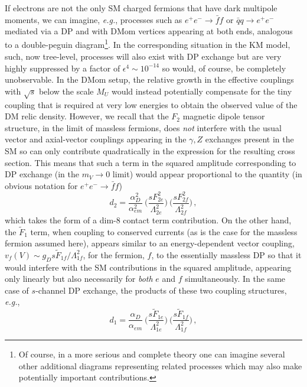 \documentclass[14pt]{article}
\def\eg{{\it e.g.}}
\def\to{\rightarrow}
\begin{document}
{If electrons are not the only SM charged fermions that have dark multipole moments, we can imagine, \eg, processes such as $e^+e^-\to \bar ff$ or $\bar qq\to e^+e^-$ mediated via a DP and with 
DMom vertices appearing at both ends, analogous to a double-peguin diagram{\footnote {Of course, in a more serious and complete theory one can imagine several other additional diagrams 
representing related processes which may also make potentially important 
contributions.}}. In the corresponding situation in the KM model, such, now tree-level, processes will also exist with DP exchange but are very highly suppressed by a factor of $\epsilon^4\sim 10^{-14}$ 
so would, of course, be completely unobservable. In the DMom setup, the relative growth in the effective couplings with $\sqrt s$ below the scale $M_U$ would instead potentially compensate for the 
tiny coupling that is required at very low energies to obtain the observed value of the DM relic density. 
However, we recall that the $F_2$ magnetic dipole tensor structure, in the limit of massless fermions, does {\it not} interfere with the usual vector and axial-vector couplings appearing in  the 
$\gamma,Z$ exchanges present in the 
SM so can only contribute quadratically in the expression for the resulting cross section. This means that such a term in the squared amplitude corresponding to DP exchange (in the $m_V\to 0$ limit) 
would appear proportional to the quantity (in obvious notation for $e^+e^-\to \bar ff$)
%
\begin{equation}
d_2=\frac{\alpha_D^2}{\alpha_{em}^2}~\Bigg(\frac{ sF_{2e}^2}{\Lambda_{2e}^2}\Bigg)~\Bigg(\frac{sF_{2f}^2}{\Lambda_{2f}^2}\Bigg)\,,  
\end{equation}
%
which takes the form of a dim-8 contact term contribution. On the other hand, the $\tilde F_1$ term, when coupling to conserved currents (as is the case for the massless fermion assumed here), 
appears similar to an energy-dependent vector coupling, $v_f(V)\sim g_D s \tilde F_{1f}/\Lambda_{1f}^2$, for the fermion, $f$, to the essentially massless DP so that it would interfere with the 
SM contributions in the squared amplitude, appearing only linearly but also necessarily for {\it both} $e$ and $f$ simultaneously.  In the same case of $s$-channel DP exchange, the products of 
these two coupling structures, \eg, 
%
\begin{equation}
d_1=\frac{\alpha_D}{\alpha_{em}}~\Bigg(\frac{s\tilde F_{1e}}{\Lambda_{1e}^2}\Bigg)~\Bigg(\frac{s \tilde F_{1f}}{\Lambda_{1f}^2}\Bigg)\,,  
\end{equation}
}
\end{document}
